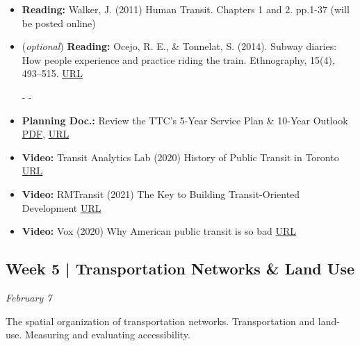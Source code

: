 \documentclass[11pt]{article}
\begin{document}
	\begin{itemize}
		\item \textbf{Reading:} Walker, J. (2011) Human Transit. Chapters 1 and 2. pp.1-37 (will be posted online)
		
		\item (\textit{optional}) \textbf{Reading:} Ocejo, R. E., \& Tonnelat, S. (2014). Subway diaries: How people experience and practice riding the train. Ethnography, 15(4), 493–515.
		\href{https://doi.org/10.1177/1466138113491171}{URL}
		
		- -
		
		\item \textbf{Planning Doc.:} Review the TTC’s 5-Year Service Plan \& 10-Year Outlook \href{https://ttc-cdn.azureedge.net/-/media/Project/TTC/DevProto/Documents/Home/About-the-TTC/5_year_plan_10_year_outlook/Attachment-1-TTC_5_year_SP_web_accessible_R3.pdf?rev=69cfa3fbb3034d8a8ca5aaff03bf6a17&hash=9208204C7255C70154C0DFD161BA16F9}{PDF}, \href{https://www.ttc.ca/about-the-ttc/projects-and-plans/5-Year-Service-Plan-and-10-Year-Outlook}{URL}
		
		\item \textbf{Video:} Transit Analytics Lab (2020) History of Public Transit in Toronto \href{https://www.youtube.com/watch?v=0Rd4RzsRsWg}{URL}
		
		\item \textbf{Video:} RMTransit (2021) The Key to Building Transit-Oriented Development \href{https://www.youtube.com/watch?v=5HSI_PZBsPc}{URL}
		
		\item \textbf{Video:} Vox (2020) Why American public transit is so bad \href{https://www.youtube.com/watch?v=-ZDZtBRTyeI}{URL}
		
	\end{itemize}
	
	
	
	
	
	
	
	
	
	
	\subsection*{Week 5 | Transportation Networks \& Land Use}
	
	\textit{February 7}
	
	The spatial organization of transportation networks. Transportation and land-use. Measuring and evaluating accessibility.
	
\end{document}
